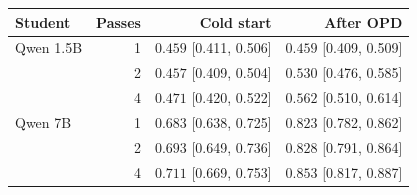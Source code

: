 \begin{tabular}{lrrr}
\toprule
Student & Passes & Cold start & After OPD\\
\midrule
Qwen 1.5B
 & 1 & $0.459$ [0.411, 0.506] & $0.459$ [0.409, 0.509]\\
 & 2 & $0.457$ [0.409, 0.504] & $0.530$ [0.476, 0.585]\\
 & 4 & $0.471$ [0.420, 0.522] & $0.562$ [0.510, 0.614]\\
\midrule
Qwen 7B
 & 1 & $0.683$ [0.638, 0.725] & $0.823$ [0.782, 0.862]\\
 & 2 & $0.693$ [0.649, 0.736] & $0.828$ [0.791, 0.864]\\
 & 4 & $0.711$ [0.669, 0.753] & $0.853$ [0.817, 0.887]\\
\bottomrule
\end{tabular}
